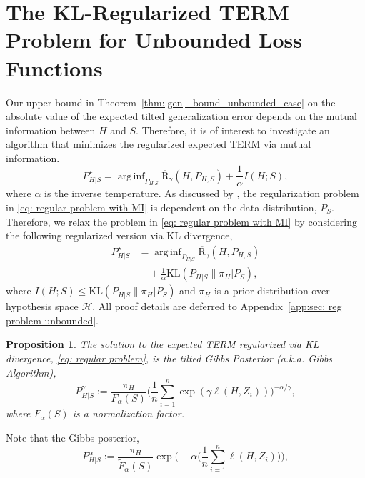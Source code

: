 \documentclass{article}
\theoremstyle{plain}
\theoremstyle{plain}
\newtheorem{proposition}[theorem]{Proposition}
\theoremstyle{definition}
\theoremstyle{remark}
\newcommand{\RTT}{\overline{\mathrm{R}}_{\gamma}}
\newcommand{\KLr}{\mathrm{KL}}
\newcommand{\nn}{\nonumber}
\begin{document}
\section{The KL-Regularized TERM Problem for Unbounded Loss Functions}\label{sec: reg problem unbounded}
Our upper bound in Theorem~\ref{thm:|gen|_bound_unbounded_case} on the absolute value of the expected tilted generalization error depends on the mutual information between $H$ and $S$. Therefore, it is of interest to investigate  
an algorithm that minimizes the regularized expected TERM via mutual information.
\begin{equation}\label{eq: regular problem with MI}
P_{H|S}^{\star}=\mathop{\mathrm{arg}\, \inf}_{P_{H|S}}\RTT(H,P_{H,S})+\frac{1}{\alpha}I(H;S),
\end{equation}
where $\alpha$ is the inverse temperature. As discussed by \citet{xu2017information,aminian2023mean}, the regularization problem in \eqref{eq: regular problem with MI} is dependent on the data distribution, $P_S$. Therefore, we relax the problem in \eqref{eq: regular problem with MI} by considering the following regularized version via KL divergence,
\begin{align}\label{eq: regular problem}
 P_{H|S}^{\star}&=\mathop{\mathrm{arg}\, \inf}_{P_{H|S}}\RTT(H,P_{H,S})\\\nn&\quad+\frac{1}{\alpha}\KLr(P_{H|S}\|\pi_H|P_S),
\end{align}
 where $I(H;S)\leq \KLr(P_{H|S}\|\pi_H|P_S)$ and $\pi_H$ is a prior distribution over hypothesis space $\mathcal{H}$. All proof details are deferred to Appendix~\ref{app:sec: reg problem unbounded}.
\begin{proposition}\label{prop: tilted gibbs_unbounded}
    The solution to the expected TERM regularized via KL divergence, \eqref{eq: regular problem}, is the tilted Gibbs Posterior (a.k.a. Gibbs Algorithm),
    \begin{equation}\label{eq: algorithm gibbs tilte app}
        P_{H|S}^{\gamma}:=\frac{\pi_H}{F_{\alpha}(S)} \Big(\frac{1}{n}\sum_{i=1}^n\exp(\gamma \ell(H,Z_i))\Big)^{-\alpha/\gamma},
    \end{equation}
    where $F_{\alpha}(S)$ is a normalization factor.
\end{proposition}
 Note that the Gibbs posterior,
    \begin{equation}\label{eq: Gibbs Algorithm}P_{H|S}^{\alpha}:=\frac{\pi_H}{\tilde{F}_{\alpha}(S)} \exp\Big(-\alpha\Big(\frac{1}{n}\sum_{i=1}^n\ell(H,Z_i)\Big)\Big),\end{equation}
\end{document}

